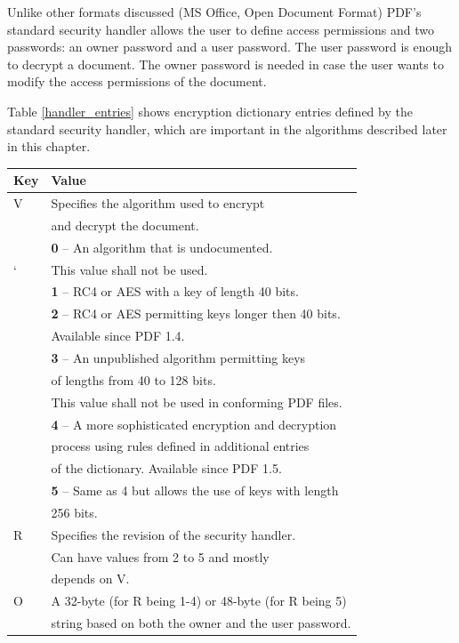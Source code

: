 \documentclass[11pt,oneside]{fithesis2}
\begin{document}
Unlike other formats discussed (MS Office, Open Document Format) PDF's standard security handler allows the user to define access permissions and two passwords: an owner password and a user password. The user password is enough to decrypt a document. The owner password is needed in case the user wants to modify the access permissions of the document.

Table \ref{handler_entries} shows encryption dictionary entries defined by the standard security handler, which are important in the algorithms described later in this chapter.

\begin{table}[hp]
	\centering
	\begin{tabular}{|l|l|}
               	\hline
		\textbf{Key}&\textbf{Value}\\
		\hline
		V&Specifies the algorithm used to encrypt \\
		&and decrypt the document.\\
		&\textbf{0} -- An algorithm that is undocumented.\\
	`	&This value shall not be used.\\
		&\textbf{1} -- RC4 or AES with a key of length 40 bits.\\
		&\textbf{2} -- RC4 or AES permitting keys longer then 40 bits.\\
		&Available since PDF 1.4.\\
		&\textbf{3} -- An unpublished algorithm permitting keys\\
		&of lengths from 40 to 128 bits.\\
		&This value shall not be used in conforming PDF files.\\
		&\textbf{4} -- A more sophisticated encryption and decryption\\
		&process using rules defined in additional entries\\
		&of the dictionary. Available since PDF 1.5.\\
		&\textbf{5} -- Same as 4 but allows the use of keys with length\\
		&256 bits.\\
	\hline
		R&Specifies the revision of the security handler.\\
		&Can have values from 2 to 5 and mostly \\
		&depends on V.\\
	\hline
		O&A 32-byte (for R being 1-4) or 48-byte (for R being 5)\\ 
		&string based on both the owner and the user password.\\

\end{tabular}
\end{table}
\end{document}
